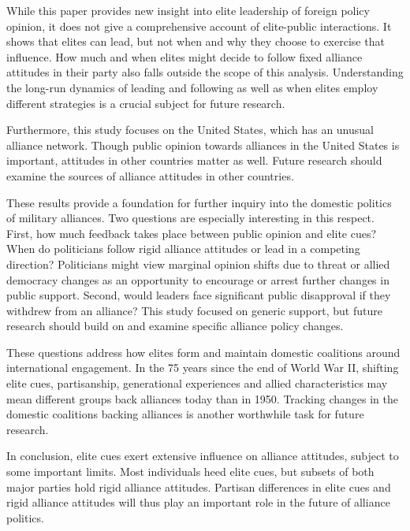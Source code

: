 \documentclass[12pt]{article}
\begin{document}
While this paper provides new insight into elite leadership of foreign policy opinion, it does not give a comprehensive account of elite-public interactions.
It shows that elites can lead, but not when and why they choose to exercise that influence. 
How much and when elites might decide to follow fixed alliance attitudes in their party also falls outside the scope of this analysis. 
Understanding the long-run dynamics of leading and following as well as when elites employ different strategies is a crucial subject for future research. 


Furthermore, this study focuses on the United States, which has an unusual alliance network. 
Though public opinion towards alliances in the United States is important, attitudes in other countries matter as well. 
Future research should examine the sources of alliance attitudes in other countries. 


These results provide a foundation for further inquiry into the domestic politics of military alliances. 
Two questions are especially interesting in this respect.
First, how much feedback takes place between public opinion and elite cues? 
When do politicians follow rigid alliance attitudes or lead in a competing direction? 
Politicians might view marginal opinion shifts due to threat or allied democracy changes as an opportunity to encourage or arrest further changes in public support.
Second, would leaders face significant public disapproval if they withdrew from an alliance? 
This study focused on generic support, but future research should build on \citet{TomzWeeks2021} and examine specific alliance policy changes. 


These questions address how elites form and maintain domestic coalitions around international engagement. 
In the 75 years since the end of World War II, shifting elite cues, partisanship, generational experiences and allied characteristics may mean different groups back alliances today than in 1950. 
Tracking changes in the domestic coalitions backing alliances is another worthwhile task for future research.


In conclusion, elite cues exert extensive influence on alliance attitudes, subject to some important limits.
Most individuals heed elite cues, but subsets of both major parties hold rigid alliance attitudes. 
Partisan differences in elite cues and rigid alliance attitudes will thus play an important role in the future of alliance politics.



\newpage

 
 
\end{document}
